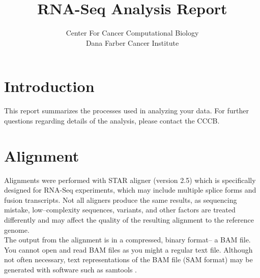 \documentclass{article}
\title{RNA-Seq Analysis Report}
\author{Center For Cancer Computational Biology \\ Dana Farber Cancer Institute}
\begin{document}
\maketitle

\section{Introduction}
This report summarizes the processes used in analyzing your data. For further questions regarding details of the analysis, please contact the CCCB.

\section{Alignment}
Alignments were performed with STAR aligner  (version 2.5) \cite{star} which is specifically designed for RNA-Seq experiments, which may include multiple splice forms and fusion transcripts.  Not all aligners produce the same results, as sequencing mistake, low--complexity sequences, variants, and other factors are treated differently and may affect the quality of the resulting alignment to the reference genome.\\

The output from the alignment is in a compressed, binary format-- a BAM file.  You cannot open and read BAM files as you might a regular text file.  Although not often necessary, text representations of the BAM file (SAM format) may be generated with software such as samtools \cite{samtools}.\\
\end{document}

